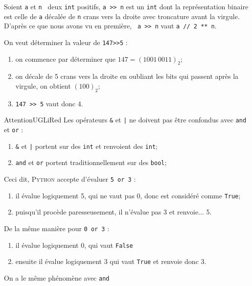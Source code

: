 \documentclass[a4paper,10pt,cours,firamath]{nsi}
\begin{document}
\begin{definition}[ : opérateur >>]
	Soient \texttt{a} et \texttt{n } deux \texttt{int} positifs, \texttt{a >> n} est un \texttt{int} dont la représentation binaire est celle de \texttt{a} décalée de \texttt{n} crans vers la droite avec troncature avant la virgule.
	D'après ce que nous avons vu en première, \texttt{ a >> n} vaut \texttt{a // 2 ** n}.
\end{definition}

\begin{exemple}[]
	On veut déterminer la valeur de \texttt{147>>5} :
	\begin{enumerate}
		\item 	on commence par déterminer que $147=(1001\,0011)_2$;
		\item 	on décale de 5 crans vers la droite en oubliant les bits qui passent après la virgule, on obtient $(100)_2$;
		\item 	\texttt{147 >> 5} vaut donc 4.
	\end{enumerate}
\end{exemple}

\begin{encadrecolore}{Attention}{UGLiRed}
	Les opérateurs \texttt{\&} et \texttt{|} ne doivent pas être confondus avec \texttt{and} et \texttt{or} :
	\begin{enumerate}
		\item 	\texttt{\&} et \texttt{|} portent sur des \texttt{int} et renvoient des \texttt{int};
		\item 	\texttt{and} et \texttt{or} portent traditionnellement sur des \texttt{bool};
	\end{enumerate}
	Ceci dit, \textsc{Python} accepte d'évaluer \texttt{5 or 3} :
	\begin{enumerate}
		\item 	il évalue logiquement 5, qui ne vaut pas 0, donc est considéré comme \texttt{True};
		\item 	puisqu'il procède paresseusement, il n'évalue pas 3 et renvoie... 5.
	\end{enumerate}
	
	De la même manière pour \texttt{0 or 3} :
	\begin{enumerate}
		\item 	il évalue logiquement 0, qui vaut \texttt{False}
		\item 	ensuite il évalue logiquement 3 qui vaut \texttt{True} et renvoie donc 3.
	\end{enumerate}
	
	On a le même phénomène avec \texttt{and}
\end{encadrecolore}
\end{document}
